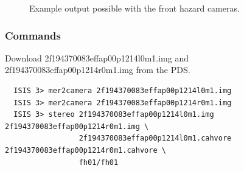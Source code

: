 \begin{figure}[h!]
\centering
  \hfil
\caption{Example output possible with the front hazard cameras.}
\label{fig:mer_example}
\end{figure}

\pagebreak

\subsubsection*{Commands}

Download 2f194370083effap00p1214l0m1.img and
2f194370083effap00p1214r0m1.img from the \ac{PDS}.

\begin{verbatim}
  ISIS 3> mer2camera 2f194370083effap00p1214l0m1.img
  ISIS 3> mer2camera 2f194370083effap00p1214r0m1.img
  ISIS 3> stereo 2f194370083effap00p1214l0m1.img 2f194370083effap00p1214r0m1.img \
                 2f194370083effap00p1214l0m1.cahvore 2f194370083effap00p1214r0m1.cahvore \
                 fh01/fh01
\end{verbatim}

